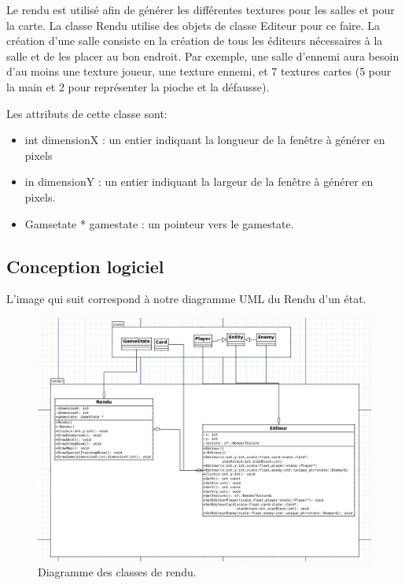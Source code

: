 Le rendu est utilisé afin de générer les différentes textures pour les salles et pour la carte. La classe Rendu utilise des objets de classe Editeur pour ce faire. La création d'une salle consiste en la création de tous les éditeurs nécessaires à la salle et de les placer au bon endroit. Par exemple, une salle d'ennemi aura besoin d'au moins une texture joueur, une texture ennemi, et 7 textures cartes (5 pour la main et 2 pour représenter la pioche et la défausse).

Les attributs de cette classe sont:
\begin{itemize}
\item int dimensionX : un entier indiquant la longueur de la fenêtre à générer en pixels
\item in dimensionY : un entier indiquant la largeur de la fenêtre à générer en pixels.
\item Gamsetate * gamestate : un pointeur vers le gamestate.
\end{itemize}

\subsection{Conception logiciel}

L'image qui suit correspond à notre diagramme UML du Rendu d'un état.

\begin{figure}[p]
\includegraphics[width = 15cm]{images/render.png}
\caption{\label{uml:render}Diagramme des classes de rendu.} 
\end{figure}


\clearpage